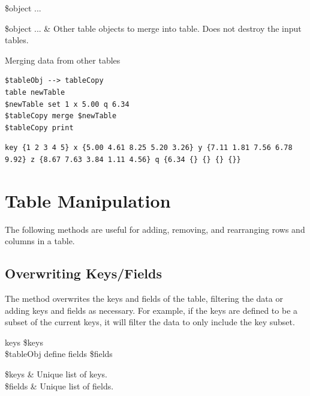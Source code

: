 \begin{syntax}
 \$object ...
\end{syntax}
\begin{args}
\$object ... & Other table objects to merge into table. Does not destroy the input tables. 
\end{args}

\begin{example}{Merging data from other tables}
\begin{lstlisting}
$tableObj --> tableCopy
table newTable
$newTable set 1 x 5.00 q 6.34
$tableCopy merge $newTable
$tableCopy print
\end{lstlisting}
\tcblower
\begin{lstlisting}
key {1 2 3 4 5} x {5.00 4.61 8.25 5.20 3.26} y {7.11 1.81 7.56 6.78 9.92} z {8.67 7.63 3.84 1.11 4.56} q {6.34 {} {} {} {}}
\end{lstlisting}
\end{example}
\clearpage
\section{Table Manipulation}
The following methods are useful for adding, removing, and rearranging rows and columns in a table.

\subsection{Overwriting Keys/Fields}
The method  overwrites the keys and fields of the table, filtering the data or adding keys and fields as necessary. 
For example, if the keys are defined to be a subset of the current keys, it will filter the data to only include the key subset. 
\begin{syntax}
 keys \$keys \\
\$tableObj define fields \$fields
\end{syntax}
\begin{args}
\$keys & Unique list of keys. \\
\$fields & Unique list of fields.
\end{args}

